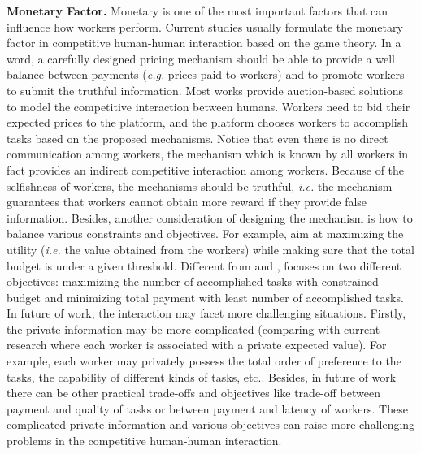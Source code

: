 \documentclass[11pt]{article}
\newcommand{\eg}{\textit{e.g.}\xspace}
\newcommand{\ie}{\textit{i.e.}\xspace}
\newcommand{\etc}{etc.\xspace}
\newcommand{\fakeparagraph}[1]{\vspace{1mm}\noindent\textbf{#1.}}
\begin{document}
\fakeparagraph{Monetary Factor}
Monetary is one of the most important factors that can influence how workers perform.
Current studies usually formulate the monetary factor in competitive human-human interaction based on the game theory.
In a word, a carefully designed pricing mechanism should be able to provide a well balance between payments (\eg prices paid to workers) and to promote workers to submit the truthful information. 
Most works provide auction-based solutions to model the competitive interaction between humans.
Workers need to bid their expected prices to the platform, and the platform chooses workers to accomplish tasks based on the proposed mechanisms.
Notice that even there is no direct communication among workers, the mechanism which is known by all workers in fact provides an indirect competitive interaction among workers.
Because of the selfishness of workers, the mechanisms should be truthful, \ie the mechanism guarantees that workers cannot obtain more reward if they provide  false information.
Besides, another consideration of designing the mechanism is how to balance various constraints and objectives.
For example, \cite{www13truthful,focs14mechanism,add-SIGMOD18} aim at maximizing the utility (\ie the value obtained from the workers) while making sure that the total budget is under a given threshold.
Different from \cite{www13truthful} and \cite{focs14mechanism}, \cite{www13pricing} focuses on two different objectives: maximizing the number of accomplished tasks with constrained budget and minimizing total payment with least number of accomplished tasks.
In future of work, the interaction may facet more challenging situations.
Firstly, the private information may be more complicated (comparing with current research where each worker is associated with a private expected value).
For example, each worker may privately possess the total order of preference to the tasks, the capability of different kinds of tasks, \etc.
Besides, in future of work there can be other practical trade-offs and objectives like trade-off between payment and quality of tasks or between payment and latency of workers.
These complicated private information and various objectives can raise more challenging problems in the competitive human-human interaction.
\end{document}
